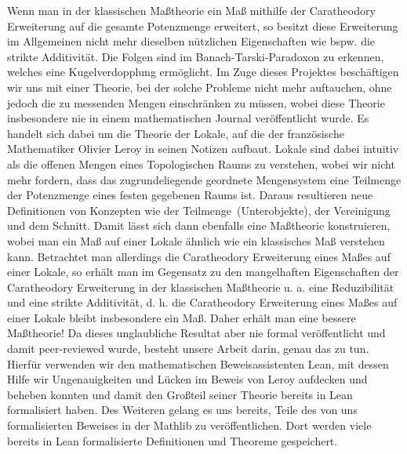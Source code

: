\documentclass[hidelinks]{article}
\begin{document}
    Wenn man in der klassischen Maßtheorie ein Maß mithilfe der Caratheodory Erweiterung auf die gesamte Potenzmenge erweitert, so besitzt diese Erweiterung im Allgemeinen nicht mehr dieselben nützlichen Eigenschaften wie bspw. die strikte Additivität. Die Folgen sind im Banach-Tarski-Paradoxon zu erkennen, welches eine Kugelverdopplung ermöglicht. Im Zuge dieses Projektes beschäftigen wir uns mit einer Theorie, bei der solche Probleme nicht mehr auftauchen, ohne jedoch die zu messenden Mengen einschränken zu müssen, wobei diese Theorie insbesondere nie in einem mathematischen Journal veröffentlicht wurde. Es handelt sich dabei um die Theorie der Lokale, auf die der französische Mathematiker Olivier Leroy in seinen Notizen aufbaut. Lokale sind dabei intuitiv als die offenen Mengen eines Topologischen Raums zu verstehen, wobei wir nicht mehr fordern, dass das zugrundeliegende geordnete Mengensystem eine Teilmenge der Potenzmenge eines festen gegebenen Raums ist. Daraus resultieren neue Definitionen von Konzepten wie der \glqq Teilmenge\grqq~(Unterobjekte), der Vereinigung und dem Schnitt. Damit lässt sich dann ebenfalls eine Maßtheorie konstruieren, wobei man ein Maß auf einer Lokale ähnlich wie ein klassisches Maß verstehen kann. Betrachtet man allerdings die Caratheodory Erweiterung eines Maßes auf einer Lokale, so erhält man im Gegensatz zu den mangelhaften Eigenschaften der Caratheodory Erweiterung in der klassischen Maßtheorie u. a. eine Reduzibilität und eine strikte Additivität, d. h. die Caratheodory Erweiterung eines Maßes auf einer Lokale bleibt insbesondere ein Maß. Daher erhält man eine bessere Maßtheorie! Da dieses unglaubliche Resultat aber nie formal veröffentlicht und damit peer-reviewed wurde, besteht unsere Arbeit darin, genau das zu tun. Hierfür verwenden wir den mathematischen Beweisassistenten Lean, mit dessen Hilfe wir Ungenauigkeiten und Lücken im Beweis von Leroy aufdecken und beheben konnten und damit den Großteil seiner Theorie bereits in Lean formalisiert haben. Des Weiteren gelang es uns bereits, Teile des von uns formalisierten Beweises in der Mathlib zu veröffentlichen. Dort werden viele bereits in Lean formalisierte Definitionen und Theoreme gespeichert.
\end{document}
